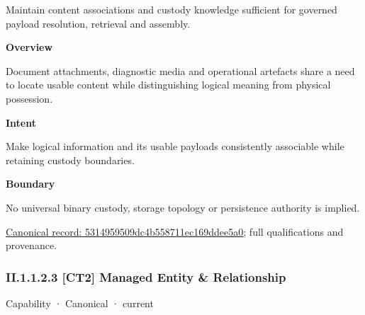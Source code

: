 Maintain content associations and custody knowledge sufficient for governed payload resolution, retrieval and assembly.



\textbf{Overview}



Document attachments, diagnostic media and operational artefacts share a need to locate usable content while distinguishing logical meaning from physical possession.



\textbf{Intent}



Make logical information and its usable payloads consistently associable while retaining custody boundaries.



\textbf{Boundary}



No universal binary custody, storage topology or persistence authority is implied.


{\footnotesize \href{../../../../continuum/strategy/capability/5314959509dc4b558711ec169ddee5a0.md}{Canonical record: 5314959509dc4b558711ec169ddee5a0}; full qualifications and provenance.}\par
\subsubsection*{II.1.1.2.3 [CT2] Managed Entity \& Relationship}
\label{navigation:II.1.1.2.3}

\label{element:910634fb1621416c818a022ab0b5d3a1}
{\small Capability · Canonical · current}\par

